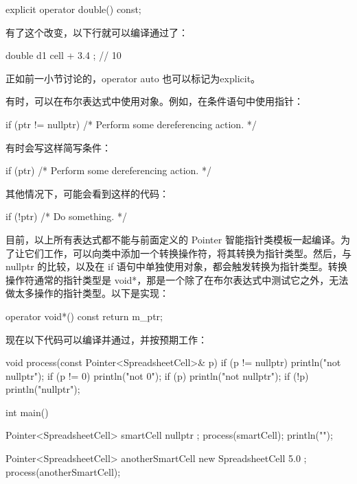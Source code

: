 \begin{cpp}
explicit operator double() const;
\end{cpp}

有了这个改变，以下行就可以编译通过了：

\begin{cpp}
double d1 { cell + 3.4 }; // 10
\end{cpp}

正如前一小节讨论的，operator auto 也可以标记为explicit。


有时，可以在布尔表达式中使用对象。例如，在条件语句中使用指针：

\begin{cpp}
if (ptr != nullptr) { /* Perform some dereferencing action. */ }
\end{cpp}

有时会写这样简写条件：

\begin{cpp}
if (ptr) { /* Perform some dereferencing action. */ }
\end{cpp}

其他情况下，可能会看到这样的代码：

\begin{cpp}
if (!ptr) { /* Do something. */ }
\end{cpp}

目前，以上所有表达式都不能与前面定义的 Pointer 智能指针类模板一起编译。为了让它们工作，可以向类中添加一个转换操作符，将其转换为指针类型。然后，与 nullptr 的比较，以及在 if 语句中单独使用对象，都会触发转换为指针类型。转换操作符通常的指针类型是 void*，那是一个除了在布尔表达式中测试它之外，无法做太多操作的指针类型。以下是实现：

\begin{cpp}
operator void*() const { return m_ptr; }
\end{cpp}

现在以下代码可以编译并通过，并按预期工作：

\begin{cpp}
void process(const Pointer<SpreadsheetCell>& p)
{
    if (p != nullptr) { println("not nullptr"); }
    if (p != 0)       { println("not 0"); }
    if (p)            { println("not nullptr"); }
    if (!p)           { println("nullptr"); }
}

int main()
{
    Pointer<SpreadsheetCell> smartCell { nullptr };
    process(smartCell);
    println("");

    Pointer<SpreadsheetCell> anotherSmartCell { new SpreadsheetCell { 5.0 } };
    process(anotherSmartCell);
}
\end{cpp}

